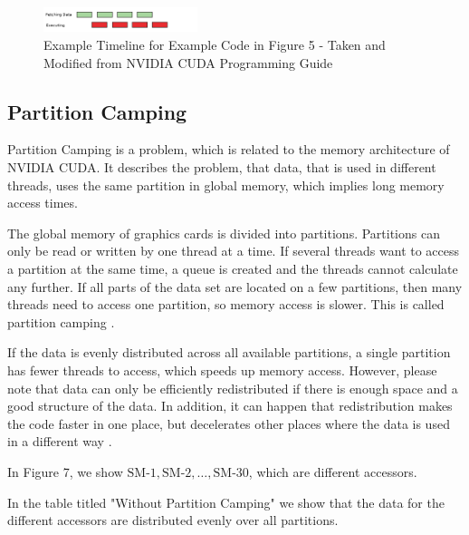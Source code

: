 \documentclass[conference]{IEEEtran}
\begin{document}
		\begin{figure}[htbp]
			\centerline{\includegraphics[width=0.4\textwidth]{DataPrefetching.png}}
			\caption{Example Timeline for Example Code in Figure 5 - Taken and Modified from NVIDIA CUDA Programming Guide}
			\label{fig2}
		\end{figure}
		
	\subsection{Partition Camping}
		
		
		Partition Camping is a problem, which is related to the memory architecture of NVIDIA CUDA. It describes the problem, that data, that is used in different threads, uses the same partition in global memory, which implies long memory access times. 
		
		
		The global memory of graphics cards is divided into partitions. Partitions can only be read or written by one thread at a time. If several threads want to access a partition at the same time, a queue is created and the threads cannot calculate any further. If all parts of the data set are located on a few partitions, then many threads need to access one partition, so memory access is slower. This is called partition camping \cite{pc} \cite{GPGPUCompiler}.
		
		If the data is evenly distributed across all available partitions, a single partition has fewer threads to access, which speeds up memory access. However, please note that data can only be efficiently redistributed if there is enough space and a good structure of the data.  In addition, it can happen that redistribution makes the code faster in one place, but decelerates other places where the data is used in a different way \cite{pc} \cite{GPGPUCompiler}.
		
		
		In Figure 7, we show $\text{SM-1}, \text{SM-2}, \dots, \text{SM-30}$, which are different accessors. 
		
		In the table titled "Without Partition Camping" we show that the data for the different accessors are distributed evenly over all partitions. 
		
\end{document}
